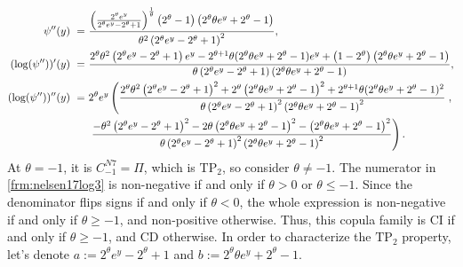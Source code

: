 \documentclass{article}
\newcommand{\TP}{\mathrm{TP_2}}
\begin{document}
\begin{itemize}
\begin{align}
        \psi''(y) ~=~ & \frac{\left(\frac{2^{\theta} e^{y}}{2^{\theta} e^{y} - 2^{\theta} + 1}\right)^{\frac{1}{\theta}} \left(2^{\theta} - 1\right) \left(2^{\theta} \theta e^{y} + 2^{\theta} - 1\right)}{\theta^{2} \left(2^{\theta} e^{y} - 2^{\theta} + 1\right)^{2}}, \nonumber\allowdisplaybreaks\\
        (\log(\psi''))'(y) ~=~ & \frac{2^{\theta} \theta^{2} \left(2^{\theta} e^{y} - 2^{\theta} + 1\right) e^{y} - 2^{\theta + 1} \theta (2^{\theta} \theta e^{y} + 2^{\theta} - 1) e^{y} + \left(1 - 2^{\theta}\right) \left(2^{\theta} \theta e^{y} + 2^{\theta} - 1\right)}{\theta \left(2^{\theta} e^{y} - 2^{\theta} + 1\right) \left(2^{\theta} \theta e^{y} + 2^{\theta} - 1\right)}, \nonumber\allowdisplaybreaks\\
        (\log(\psi''))''(y) ~=~ & 2^{\theta}e^{y}\left(\frac{2^{\theta} \theta^{2} \left(2^{\theta} e^{y} - 2^{\theta} + 1\right)^{2} + 2^{\theta} \left(2^{\theta} \theta e^{y} + 2^{\theta} - 1\right)^{2} + 2^{\theta + 1} \theta (2^{\theta} \theta e^{y} + 2^{\theta} - 1)^{2}}{\theta \left(2^{\theta} e^{y} - 2^{\theta} + 1\right)^{2} \left(2^{\theta} \theta e^{y} + 2^{\theta} - 1\right)^{2}} \right. \label{frm:nelsen17log4}, \\
        & \left.\frac{- \theta^{2} \left(2^{\theta} e^{y} - 2^{\theta} + 1\right)^{2} - 2 \theta \left(2^{\theta} \theta e^{y} + 2^{\theta} - 1\right)^{2} - \left(2^{\theta} \theta e^{y} + 2^{\theta} - 1\right)^{2}}{\theta \left(2^{\theta} e^{y} - 2^{\theta} + 1\right)^{2} \left(2^{\theta} \theta e^{y} + 2^{\theta} - 1\right)^{2}} \right)\nonumber.
    \end{align}
    At $\theta=-1$, it is $C^{N7}_{-1}=\Pi$, which is $\TP$, so consider $\theta\neq -1$.
    The numerator in \eqref{frm:nelsen17log3} is non-negative if and only if $\theta > 0$ or $\theta \leq -1$.
    Since the denominator flips signs if and only if $\theta < 0$, the whole expression is non-negative if and only if $\theta \geq -1$, and non-positive otherwise.
    Thus, this copula family is CI if and only if $\theta \geq -1$, and CD otherwise.
    In order to characterize the $\TP$ property, let's denote $a:=2^\theta e^y - 2^\theta + 1$ and $b:=2^\theta \theta e^y + 2^\theta - 1$.

\end{itemize}
\end{document}
